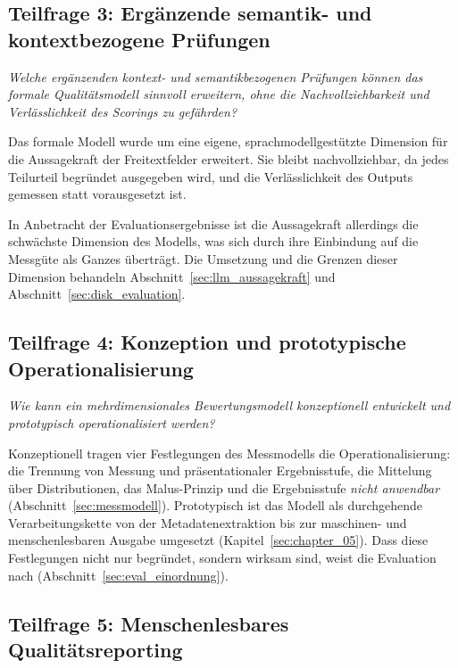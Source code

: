 \subsection[Teilfrage 3: Semantik- und kontextbezogene Prüfungen]{Teilfrage 3: Ergänzende semantik- und kontextbezogene Prüfungen}
\label{sec:disk_semantik}

\emph{Welche ergänzenden kontext- und semantikbezogenen Prüfungen können das
formale Qualitätsmodell sinnvoll erweitern, ohne die Nachvollziehbarkeit und
Verlässlichkeit des Scorings zu gefährden?}

Das formale Modell wurde um eine eigene, sprachmodellgestützte Dimension für
die Aussagekraft der Freitextfelder erweitert. Sie bleibt nachvollziehbar, da
jedes Teilurteil begründet ausgegeben wird, und die Verlässlichkeit des Outputs gemessen statt vorausgesetzt ist. 

In Anbetracht der Evaluationsergebnisse ist die Aussagekraft allerdings die schwächste Dimension des Modells, was sich durch ihre Einbindung auf die Messgüte als Ganzes überträgt. 
Die Umsetzung und die Grenzen dieser Dimension behandeln Abschnitt~\ref{sec:llm_aussagekraft} und Abschnitt~\ref{sec:disk_evaluation}.

\subsection{Teilfrage 4: Konzeption und prototypische Operationalisierung}
\label{sec:disk_konzept_prototyp}

\emph{Wie kann ein mehrdimensionales Bewertungsmodell konzeptionell entwickelt
und prototypisch operationalisiert werden?}

Konzeptionell tragen vier Festlegungen des Messmodells die Operationalisierung:
die Trennung von Messung und präsentationaler Ergebnisstufe, die Mittelung über
Distributionen, das Malus-Prinzip und die Ergebnisstufe \emph{nicht anwendbar}
(Abschnitt~\ref{sec:messmodell}). Prototypisch ist das Modell als durchgehende
Verarbeitungskette von der Metadatenextraktion bis zur maschinen- und
menschenlesbaren Ausgabe umgesetzt (Kapitel~\ref{sec:chapter_05}). Dass diese
Festlegungen nicht nur begründet, sondern wirksam sind, weist die Evaluation nach
(Abschnitt~\ref{sec:eval_einordnung}).

\subsection{Teilfrage 5: Menschenlesbares Qualitätsreporting}
\label{sec:disk_nachvollziehbarkeit}

